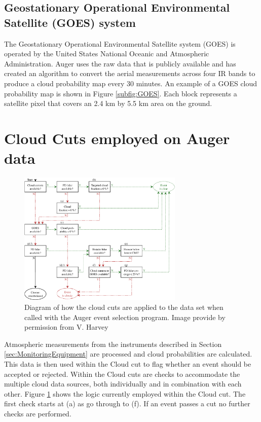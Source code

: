 \subsection{Geostationary Operational Environmental Satellite (GOES) system}

The Geostationary Operational Environmental Satellite system (GOES) is operated by the United States National Oceanic and Atmospheric Administration. Auger uses the raw data that is publicly available and has created an algorithm to convert the aerial measurements across four IR bands to produce a cloud probability map every 30 minutes. An example of a GOES cloud probability map is shown in Figure \ref{subfig:GOES}. Each block represents a satellite pixel that covers an 2.4 km by 5.5 km area on the ground.

\section{Cloud Cuts employed on Auger data}  \label{Sec:Cloud_Cut_Outline}

\begin{figure}[!t]
\centering
\includegraphics[width=0.7\textwidth]{chapters/graphs/CloudFlags/cloud_cuts.pdf}
\caption{Diagram of how the cloud cuts are applied to the data set when called with the Auger event selection program. Image provide by permission from V. Harvey} \label{fig:Cloud_Cut_Logic}
\end{figure}

Atmospheric measurements from the instruments described in Section \ref{sec:MonitoringEquipment} are processed and cloud probabilities are calculated. This data is then used within the Cloud cut to flag whether an event should be accepted or rejected. Within the Cloud cuts are checks to accommodate the multiple cloud data sources, both individually and in combination with each other. Figure \ref{fig:Cloud_Cut_Logic} shows the logic currently employed within the Cloud cut. The first check starts at (a) as go through to (f).  If an event passes a cut no further checks are performed.

